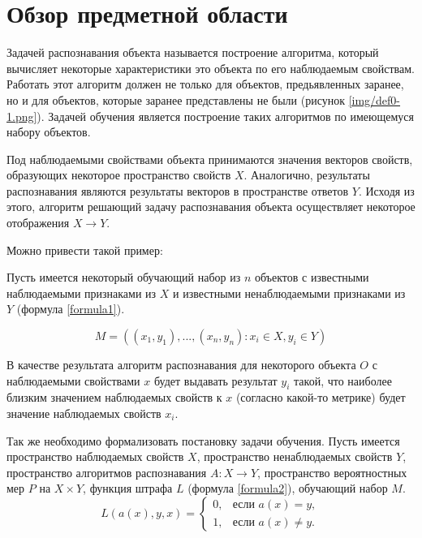 \chapter{Обзор предметной области}
Задачей распознавания объекта называется построение алгоритма, который вычисляет некоторые характеристики это объекта по его наблюдаемым свойствам. Работать этот алгоритм должен не только для объектов, предьявленных заранее, но и для объектов, которые заранее представлены не были (рисунок \ref{img/def0-1.png}). Задачей обучения является построение таких алгоритмов по имеющемуся набору объектов.


Под наблюдаемыми свойствами объекта принимаются значения векторов свойств, образующих некоторое пространство свойств $X$. Аналогично, результаты распознавания являются результаты векторов в пространстве ответов $Y$. Исходя из этого, алгоритм решающий задачу распознавания объекта осуществляет некоторое отображения $X \rightarrow Y$.

Можно привести такой пример:

Пусть имеется некоторый обучающий набор из $n$ объектов с известными наблюдаемыми признаками из $X$ и известными ненаблюдаемыми признаками из $Y$ (формула \ref{formula1}).

\begin{equation}
M = ((x_1, y_1), ... , (x_n, y_n) : x_i \in X, y_i \in Y)
\label{formula1}
\end{equation}

В качестве результата алгоритм распознавания для некоторого объекта $O$ с наблюдаемыми свойствами $x$ будет выдавать результат $y_i$ такой, что наиболее близким значением наблюдаемых свойств к $x$ (согласно какой-то метрике) будет значение наблюдаемых свойств $x_i$. 

Так же необходимо формализовать постановку задачи обучения. Пусть имеется пространство наблюдаемых свойств $X$, пространство ненаблюдаемых свойств $Y$, пространство алгоритмов распознавания $A: X \rightarrow Y$, пространство вероятностных мер $P$ на $X \times Y$, функция штрафа $L$ (формула \ref{formula2}), обучающий набор $M$. 
\begin{equation}
L(a(x), y, x) =
\begin{cases}
0, & \text{если } a(x) = y, \\
1, & \text{если } a(x) \neq y.
\end{cases}
\label{formula2}
\end{equation}

